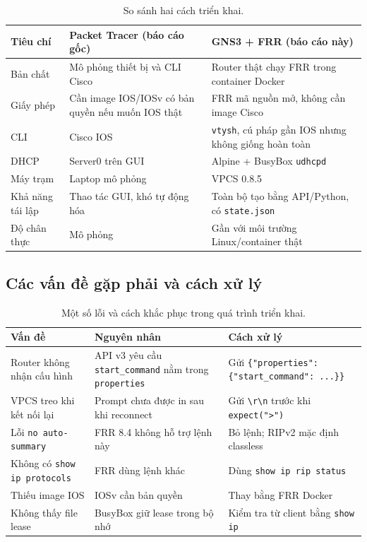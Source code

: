 \documentclass[12pt,a4paper]{article}
\begin{document}
\begin{table}[H]
  \centering
  \caption{So sánh hai cách triển khai.}
  \label{tab:compare}
  \small
  \begin{tabularx}{\textwidth}{@{}l X X@{}}
    \toprule
    \textbf{Tiêu chí} & \textbf{Packet Tracer (báo cáo gốc)} & \textbf{GNS3 + FRR (báo cáo này)} \\
    \midrule
    Bản chất & Mô phỏng thiết bị và CLI Cisco & Router thật chạy FRR trong container Docker \\
    Giấy phép & Cần image IOS/IOSv có bản quyền nếu muốn IOS thật & FRR mã nguồn mở, không cần image Cisco \\
    CLI & Cisco IOS & \texttt{vtysh}, cú pháp gần IOS nhưng không giống hoàn toàn \\
    DHCP & Server0 trên GUI & Alpine + BusyBox \texttt{udhcpd} \\
    Máy trạm & Laptop mô phỏng & VPCS 0.8.5 \\
    Khả năng tái lập & Thao tác GUI, khó tự động hóa & Toàn bộ tạo bằng API/Python, có \texttt{state.json} \\
    Độ chân thực & Mô phỏng & Gần với môi trường Linux/container thật \\
    \bottomrule
  \end{tabularx}
\end{table}

\subsection{Các vấn đề gặp phải và cách xử lý}

\begin{table}[H]
  \centering
  \caption{Một số lỗi và cách khắc phục trong quá trình triển khai.}
  \label{tab:issues}
  \small
  \begin{tabularx}{\textwidth}{@{}l X X@{}}
    \toprule
    \textbf{Vấn đề} & \textbf{Nguyên nhân} & \textbf{Cách xử lý} \\
    \midrule
    Router không nhận cấu hình & API v3 yêu cầu \texttt{start\_command} nằm trong
      \texttt{properties} & Gửi \texttt{\{"properties": \{"start\_command": ...\}\}} \\
    VPCS treo khi kết nối lại & Prompt chưa được in sau khi reconnect & Gửi \texttt{\textbackslash r\textbackslash n}
      trước khi \texttt{expect(">")} \\
    Lỗi \texttt{no auto-summary} & FRR 8.4 không hỗ trợ lệnh này & Bỏ lệnh; RIPv2 mặc định classless \\
    Không có \texttt{show ip protocols} & FRR dùng lệnh khác & Dùng \texttt{show ip rip status} \\
    Thiếu image IOS & IOSv cần bản quyền & Thay bằng FRR Docker \\
    Không thấy file lease & BusyBox giữ lease trong bộ nhớ & Kiểm tra từ client bằng \texttt{show ip} \\
    \bottomrule
  \end{tabularx}
\end{table}
\end{document}

